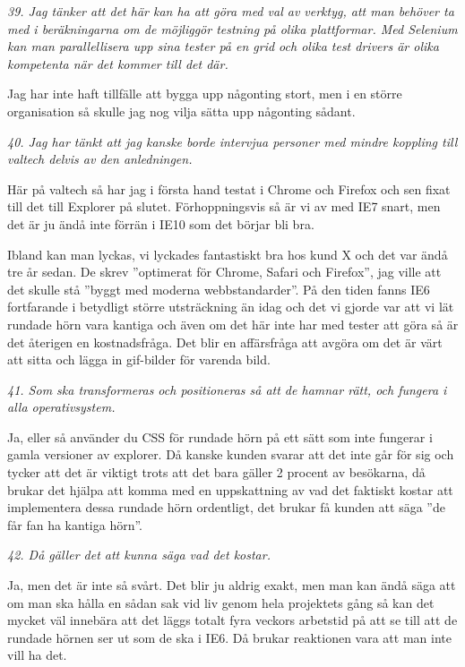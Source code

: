 \documentclass[11pt]{article}
\begin{document}
\emph{39. Jag tänker att det här kan ha att göra med val av verktyg, att man behöver ta med i beräkningarna om de möjliggör testning på olika plattformar. Med Selenium kan man parallellisera upp sina tester på en grid och olika test drivers är olika kompetenta när det kommer till det där.}

Jag har inte haft tillfälle att bygga upp någonting stort, men i en större organisation så skulle jag nog vilja sätta upp någonting sådant.

\emph{40. Jag har tänkt att jag kanske borde intervjua personer med mindre koppling till valtech delvis av den anledningen.}

Här på valtech så har jag i första hand testat i Chrome och Firefox och sen fixat till det till Explorer på slutet. Förhoppningsvis så är vi av med IE7 snart, men det är ju ändå inte förrän i IE10 som det börjar bli bra.

Ibland kan man lyckas, vi lyckades fantastiskt bra hos kund X och det var ändå tre år sedan. De skrev ”optimerat för Chrome, Safari och Firefox”, jag ville att det skulle stå ”byggt med moderna webbstandarder”. På den tiden fanns IE6 fortfarande i betydligt större utsträckning än idag och det vi gjorde var att vi lät rundade hörn vara kantiga och även om det här inte har med tester att göra så är det återigen en kostnadsfråga. Det blir en affärsfråga att avgöra om det är värt att sitta och lägga in gif-bilder för varenda bild.

\emph{41. Som ska transformeras och positioneras så att de hamnar rätt, och fungera i alla operativsystem.}

Ja, eller så använder du CSS för rundade hörn på ett sätt som inte fungerar i gamla versioner av explorer. Då kanske kunden svarar att det inte går för sig och tycker att det är viktigt trots att det bara gäller 2 procent av besökarna, då brukar det hjälpa att komma med en uppskattning av vad det faktiskt kostar att implementera dessa rundade hörn ordentligt, det brukar få kunden att säga ”de får fan ha kantiga hörn”.

\emph{42. Då gäller det att kunna säga vad det kostar.}

Ja, men det är inte så svårt. Det blir ju aldrig exakt, men man kan ändå säga att om man ska hålla en sådan sak vid liv genom hela projektets gång så kan det mycket väl innebära att det läggs totalt fyra veckors arbetstid på att se till att de rundade hörnen ser ut som de ska i IE6. Då brukar reaktionen vara att man inte vill ha det.
\end{document}
